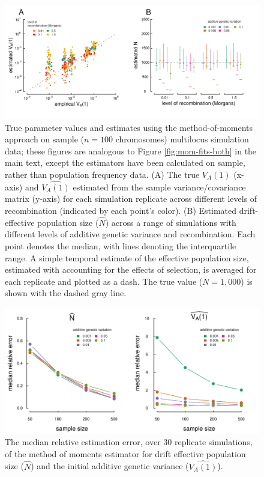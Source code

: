 \documentclass[11pt]{article}
\begin{document}
\begin{figure}
  \centering
  \includegraphics{./images/mom-fits-both-alt-finite.pdf} 

  \caption{True parameter values and estimates using the method-of-moments
      approach on sample ($n=100$ chromosomes) multilocus simulation data;
      these figures are analogous to Figure \ref{fig:mom-fits-both} in the main
      text, except the estimators have been calculated on sample, rather than
      population frequency data. (A) The true $V_A(1)$ (x-axis) and
      $\widehat{V_A(1)}$ estimated from the sample variance/covariance matrix
      (y-axis) for each simulation replicate across different levels of
      recombination (indicated by each point's color). (B) Estimated
      drift-effective population size ($\widehat{N}$) across a range of
      simulations with different levels of additive genetic variance and
      recombination. Each point denotes the median, with lines denoting the
      interquartile range. A simple temporal estimate of the effective
      population size, estimated with accounting for the effects of selection,
  is averaged for each replicate and plotted as a dash. The true value ($N =
  1,000$) is shown with the dashed gray line.}

\label{fig:mom-fits-both-finite}
\end{figure}


\begin{figure}
  \centering
  \includegraphics{./images/supp-relative-error.pdf} 

  \caption{The median relative estimation error, over 30 replicate simulations,
  of the method of moments estimator for drift effective population size
($\widehat{N}$) and the initial additive genetic variance ($\widehat{V_A(1)}$).
} 

\label{fig:mom-relative}
\end{figure}
\end{document}
